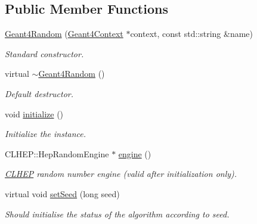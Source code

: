 \subsection*{Public Member Functions}
\begin{DoxyCompactItemize}
\item 
\hyperlink{class_d_d4hep_1_1_simulation_1_1_geant4_random_a44e88e26d5ae30b269b81c6d2dfc6511}{Geant4Random} (\hyperlink{class_d_d4hep_1_1_simulation_1_1_geant4_context}{Geant4Context} $\ast$context, const std::string \&name)
\begin{DoxyCompactList}\small\item\em Standard constructor. \item\end{DoxyCompactList}\item 
virtual \hyperlink{class_d_d4hep_1_1_simulation_1_1_geant4_random_a36518f1890fdb6177b2296b5f905fb07}{$\sim$Geant4Random} ()
\begin{DoxyCompactList}\small\item\em Default destructor. \item\end{DoxyCompactList}\item 
void \hyperlink{class_d_d4hep_1_1_simulation_1_1_geant4_random_a31f43f8b61c1eacccac4d89945e97f6b}{initialize} ()
\begin{DoxyCompactList}\small\item\em Initialize the instance. \item\end{DoxyCompactList}\item 
CLHEP::HepRandomEngine $\ast$ \hyperlink{class_d_d4hep_1_1_simulation_1_1_geant4_random_a80dcc27ca6d3ddc4a99f6f3b9d0d4465}{engine} ()
\begin{DoxyCompactList}\small\item\em \hyperlink{namespace_c_l_h_e_p}{CLHEP} random number engine (valid after initialization only). \item\end{DoxyCompactList}\item 
virtual void \hyperlink{class_d_d4hep_1_1_simulation_1_1_geant4_random_a67c43b5a941c94c3bbf7d134274bbde8}{setSeed} (long seed)
\begin{DoxyCompactList}\small\item\em Should initialise the status of the algorithm according to seed. \item\end{DoxyCompactList}\item 

\end{DoxyCompactItemize}
